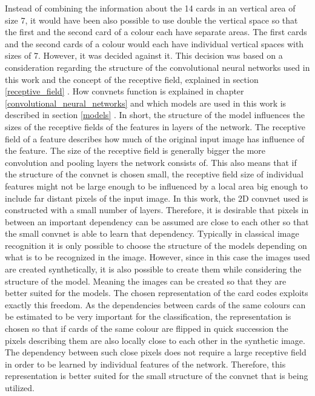 Instead of combining the information about the 14 cards in an vertical area of size 7, it would have been also possible to use double the vertical space so that the first and the second card of a colour each have separate areas. The first cards and the second cards of a colour would each have individual vertical spaces with sizes of 7. However, it was decided against it. This decision was based on a consideration regarding the structure of the convolutional neural networks used in this work and the concept of the receptive field, explained in section \ref{receptive_field} . How convnets function is explained in chapter \ref{convolutional_neural_networks}  and which models are used in this work is described in section \ref{models} . In short, the structure of the model influences the sizes of the receptive fields of the features in layers of the network. The receptive field of a feature describes how much of the original input image has influence of the feature. The size of the receptive field is generally bigger the more convolution and pooling layers the network consists of. This also means that if the structure of the convnet is chosen small, the receptive field size of individual features might not be large enough to be influenced by a local area big enough to include far distant pixels of the input image. In this work, the 2D convnet used is constructed with a small number of layers. Therefore, it is desirable that pixels in between an important dependency can be assumed are close to each other so that the small convnet is able to learn that dependency. Typically in classical image recognition it is only possible to choose the structure of the models depending on what is to be recognized in the image. However, since in this case the images used are created synthetically, it is also possible to create them while considering the structure of the model. Meaning the images can be created so that they are better suited for the models. The chosen representation of the card codes exploits exactly this freedom. As the dependencies between cards of the same colours can be estimated to be very important for the classification, the representation is chosen so that if cards of the same colour are flipped in quick succession the pixels describing them are also locally close to each other in the synthetic image. The dependency between such close pixels does not require a large receptive field in order to be learned by individual features of the network. Therefore, this representation is better suited for the small structure of the convnet that is being utilized. 


